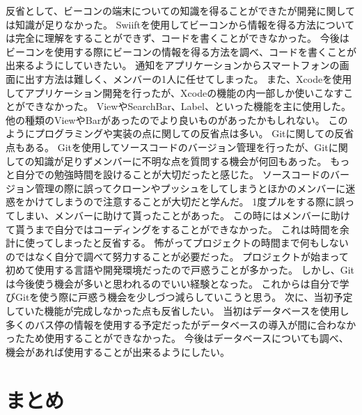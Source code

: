 \documentclass[openany,11pt,papersize]{jsbook}
\begin{document}
反省として、ビーコンの端末についての知識を得ることができたが開発に関しては知識が足りなかった。
Swiiftを使用してビーコンから情報を得る方法については完全に理解をすることができず、コードを書くことができなかった。
今後はビーコンを使用する際にビーコンの情報を得る方法を調べ、コードを書くことが出来るようにしていきたい。
通知をアプリケーションからスマートフォンの画面に出す方法は難しく、メンバーの1人に任せてしまった。
また、Xcodeを使用してアプリケーション開発を行ったが、Xcodeの機能の内一部しか使いこなすことができなかった。
ViewやSearchBar、Label、といった機能を主に使用した。
他の種類のViewやBarがあったのでより良いものがあったかもしれない。
このようにプログラミングや実装の点に関しての反省点は多い。
Gitに関しての反省点もある。
Gitを使用してソースコードのバージョン管理を行ったが、Gitに関しての知識が足りずメンバーに不明な点を質問する機会が何回もあった。
もっと自分での勉強時間を設けることが大切だったと感じた。
ソースコードのバージョン管理の際に誤ってクローンやプッシュをしてしまうとほかのメンバーに迷惑をかけてしまうので注意することが大切だと学んだ。
1度プルをする際に誤ってしまい、メンバーに助けて貰ったことがあった。
この時にはメンバーに助けて貰うまで自分ではコーディングをすることができなかった。
これは時間を余計に使ってしまったと反省する。
怖がってプロジェクトの時間まで何もしないのではなく自分で調べて努力することが必要だった。
プロジェクトが始まって初めて使用する言語や開発環境だったので戸惑うことが多かった。
しかし、Gitは今後使う機会が多いと思われるのでいい経験となった。
これからは自分で学びGitを使う際に戸惑う機会を少しづつ減らしていこうと思う。
次に、当初予定していた機能が完成しなかった点も反省したい。
当初はデータベースを使用し多くのバス停の情報を使用する予定だったがデータベースの導入が間に合わなかったため使用することができなかった。
今後はデータベースについても調べ、機会があれば使用することが出来るようにしたい。


\chapter{まとめ}
\end{document}

